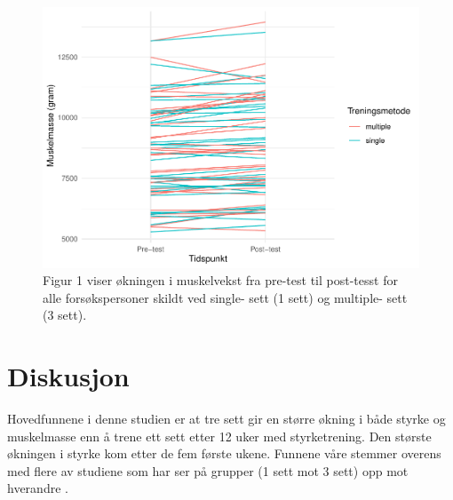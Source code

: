 \documentclass[
]{book}
\begin{document}
\begin{figure}
\centering
\includegraphics{_main_files/figure-latex/figur-1.pdf}
\caption{\label{fig:figur}Figur 1 viser økningen i muskelvekst fra pre-test til post-tesst for alle forsøkspersoner skildt ved single- sett (1 sett) og multiple- sett (3 sett).}
\end{figure}

\hypertarget{diskusjon-2}{%
\section{Diskusjon}\label{diskusjon-2}}

Hovedfunnene i denne studien er at tre sett gir en større økning i både styrke og muskelmasse enn å trene ett sett etter 12 uker med styrketrening. Den største økningen i styrke kom etter de fem første ukene. Funnene våre stemmer overens med flere av studiene som har ser på grupper (1 sett mot 3 sett) opp mot hverandre \citep{krieger2009, galvão2005, schoenfeld2016}.
\end{document}
